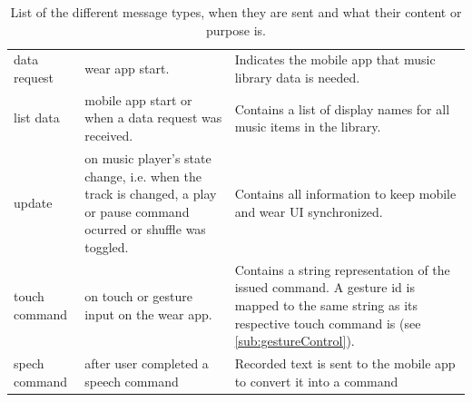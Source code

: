 \begin{table}[h]
	\myfloatalign
	\begin{tabularx}{\textwidth}{XXX} \toprule
		\tableheadline{Message Type} & \tableheadline{When Sent} & \tableheadline{Purpose} \\ 
		\midrule
		data request & wear app start. & Indicates the mobile app that music library data is needed. \\
		list data & mobile app start or when a data request was received. & Contains a list of display names for all music items in the library. \\
		update & on music player's state change, i.e. when the track is changed, a play or pause command ocurred or shuffle was toggled. & Contains all information to keep mobile and wear \ac{UI} synchronized. \\
		touch command & on touch or gesture input on the wear app. & Contains a string representation of the issued command. A gesture id is mapped to the same string as its respective touch command is (see \ref{sub:gestureControl}). \\
		spech command & after user completed a speech command & Recorded text is sent to the mobile app to convert it into a command \\
		\bottomrule
	\end{tabularx}
	\caption{List of the different message types, when they are sent and what their content or purpose is.}
	\label{tab:messageTypes}
\end{table}








